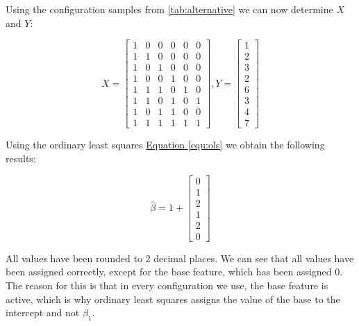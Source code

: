 Using the configuration samples from \autoref{tab:alternative} we can now determine $\textit{X}$ and $\textit{Y}$:

\begin{displaymath}
    \textit{X} = 
    \begin{bmatrix} 
        1 & 0 & 0 & 0 & 0 & 0 \\
        1 & 1 & 0 & 0 & 0 & 0 \\
        1 & 0 & 1 & 0 & 0 & 0 \\
        1 & 0 & 0 & 1 & 0 & 0 \\
        1 & 1 & 1 & 0 & 1 & 0 \\
        1 & 1 & 0 & 1 & 0 & 1 \\
        1 & 0 & 1 & 1 & 0 & 0 \\
        1 & 1 & 1 & 1 & 1 & 1 
      \end{bmatrix}
      ,
      \textit{Y} =
      \begin{bmatrix}
        1 \\
        2 \\
        3 \\
        2 \\
        6 \\
        3 \\
        4 \\
        7 
      \end{bmatrix}
\end{displaymath}


Using the ordinary least squares \hyperref[equ:ols]{Equation \ref*{equ:ols}}  we obtain the following results:

\begin{equation}
    \hat{\beta} = 1 + 
    \begin{bmatrix}
        0 \\
        1 \\
        2 \\
        1 \\
        2 \\
        0
    \end{bmatrix}
\end{equation}

All values have been rounded to 2 decimal places. 
We can see that all values have been assigned correctly, except for the base feature, which has been assigned 0. The reason for this is that in every
configuration we use, the base feature is active, which is why ordinary least squares assigns the value of the base to the intercept and not $\beta_1$. 

